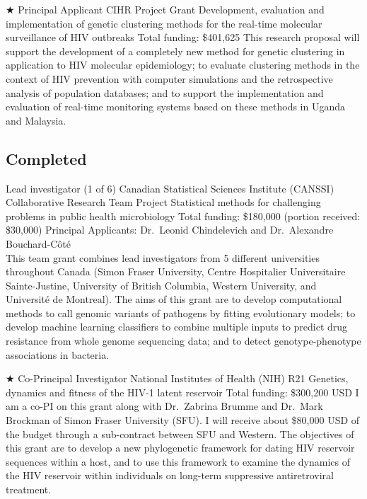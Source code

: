 {$\bigstar$ Principal Applicant}
{CIHR Project Grant} %
{Development, evaluation and implementation of genetic clustering methods for the real-time molecular surveillance of HIV outbreaks}
{Total funding: \$401,625}
{
This research proposal will support the development of a completely new method for genetic clustering in application to HIV molecular epidemiology; 
to evaluate clustering methods in the context of HIV prevention with computer simulations and the retrospective analysis of population databases; 
and to support the implementation and evaluation of real-time monitoring systems based on these methods in Uganda and Malaysia.\\
}







\vspace{1em}

\subsection {Completed}

{Lead investigator (1 of 6)}
{Canadian Statistical Sciences Institute (CANSSI) Collaborative Research Team Project}
{Statistical   methods   for   challenging   problems   in   public   health   microbiology}
{Total funding: \$180,000 (portion received: \$30,000)}
{Principal Applicants: Dr.~Leonid Chindelevich and Dr.~Alexandre Bouchard-C\^ot\'e\\
This team grant combines lead investigators from 5 different universities throughout Canada (Simon Fraser University,  Centre Hospitalier Universitaire Sainte-Justine, University of British Columbia, Western University, and Universit\'e de Montreal).
The aims of this grant are to develop computational methods to call genomic variants of pathogens by fitting evolutionary models; to develop machine learning classifiers to combine multiple inputs to predict drug resistance from whole genome sequencing data; and to detect genotype-phenotype associations in bacteria.\\
}



{$\bigstar$ Co-Principal Investigator}
{National Institutes of Health (NIH) R21}  %
{Genetics, dynamics and fitness of the HIV-1 latent reservoir}
{Total funding: \$300,200 USD}
{
I am a co-PI on this grant along with Dr.~Zabrina Brumme and Dr.~Mark Brockman of Simon Fraser University (SFU).
I will receive about \$80,000 USD of the budget through a sub-contract between SFU and Western.
The objectives of this grant are to develop a new phylogenetic framework for dating HIV reservoir sequences within a host, and to use this framework to examine the dynamics of the HIV reservoir within individuals on long-term suppressive antiretroviral treatment.
}

